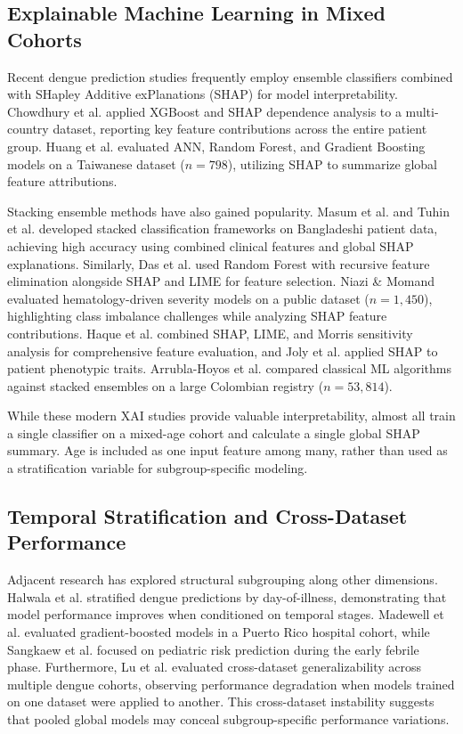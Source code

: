 \documentclass[12pt, a4paper]{report}
\begin{document}
\subsection{Explainable Machine Learning in Mixed Cohorts}
Recent dengue prediction studies frequently employ ensemble classifiers combined with SHapley Additive exPlanations (SHAP) for model interpretability. Chowdhury et al. \cite{chowdhury2022} applied XGBoost and SHAP dependence analysis to a multi-country dataset, reporting key feature contributions across the entire patient group. Huang et al. \cite{huang2020} evaluated ANN, Random Forest, and Gradient Boosting models on a Taiwanese dataset ($n=798$), utilizing SHAP to summarize global feature attributions.

Stacking ensemble methods have also gained popularity. Masum et al. \cite{masum2025} and Tuhin et al. \cite{tuhin2025} developed stacked classification frameworks on Bangladeshi patient data, achieving high accuracy using combined clinical features and global SHAP explanations. Similarly, Das et al. \cite{das2025} used Random Forest with recursive feature elimination alongside SHAP and LIME for feature selection. Niazi \& Momand \cite{niazi2026} evaluated hematology-driven severity models on a public dataset ($n=1,450$), highlighting class imbalance challenges while analyzing SHAP feature contributions. Haque et al. \cite{haque2025} combined SHAP, LIME, and Morris sensitivity analysis for comprehensive feature evaluation, and Joly et al. \cite{joly2024} applied SHAP to patient phenotypic traits. Arrubla-Hoyos et al. \cite{arrubla2023} compared classical ML algorithms against stacked ensembles on a large Colombian registry ($n=53,814$).

While these modern XAI studies provide valuable interpretability, almost all train a single classifier on a mixed-age cohort and calculate a single global SHAP summary. Age is included as one input feature among many, rather than used as a stratification variable for subgroup-specific modeling.

\subsection{Temporal Stratification and Cross-Dataset Performance}
Adjacent research has explored structural subgrouping along other dimensions. Halwala et al. \cite{halwala2025} stratified dengue predictions by day-of-illness, demonstrating that model performance improves when conditioned on temporal stages. Madewell et al. \cite{madewell2024} evaluated gradient-boosted models in a Puerto Rico hospital cohort, while Sangkaew et al. \cite{sangkaew2026} focused on pediatric risk prediction during the early febrile phase. Furthermore, Lu et al. \cite{lu2025} evaluated cross-dataset generalizability across multiple dengue cohorts, observing performance degradation when models trained on one dataset were applied to another. This cross-dataset instability suggests that pooled global models may conceal subgroup-specific performance variations.
\end{document}
